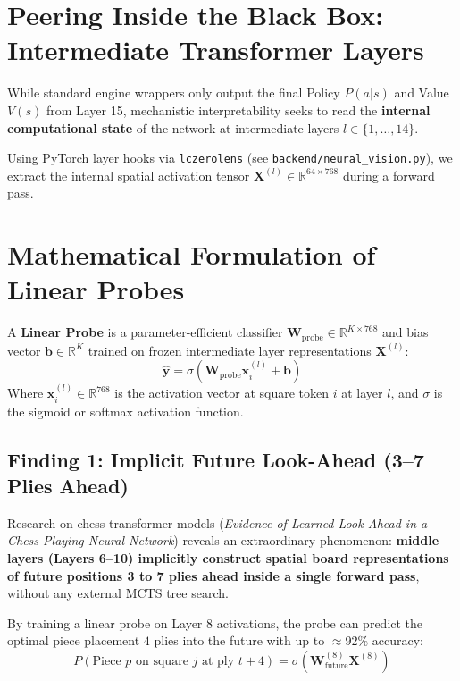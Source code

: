 \documentclass[11pt,a4paper]{report}
\begin{document}
\section{Peering Inside the Black Box: Intermediate Transformer Layers}
While standard engine wrappers only output the final Policy $P(a|s)$ and Value $V(s)$ from Layer 15, mechanistic interpretability seeks to read the \textbf{internal computational state} of the network at intermediate layers $l \in \{1, \dots, 14\}$.

Using PyTorch layer hooks via \texttt{lczerolens} (see \texttt{backend/neural\_vision.py}), we extract the internal spatial activation tensor $\mathbf{X}^{(l)} \in \mathbb{R}^{64 \times 768}$ during a forward pass.

\section{Mathematical Formulation of Linear Probes}
A \textbf{Linear Probe} is a parameter-efficient classifier $\mathbf{W}_{\text{probe}} \in \mathbb{R}^{K \times 768}$ and bias vector $\mathbf{b} \in \mathbb{R}^K$ trained on frozen intermediate layer representations $\mathbf{X}^{(l)}$:
\begin{equation}
\hat{\mathbf{y}} = \sigma \left( \mathbf{W}_{\text{probe}} \mathbf{x}_{i}^{(l)} + \mathbf{b} \right)
\end{equation}
Where $\mathbf{x}_{i}^{(l)} \in \mathbb{R}^{768}$ is the activation vector at square token $i$ at layer $l$, and $\sigma$ is the sigmoid or softmax activation function.

\subsection{Finding 1: Implicit Future Look-Ahead (3--7 Plies Ahead)}
Research on chess transformer models (\textit{Evidence of Learned Look-Ahead in a Chess-Playing Neural Network}) reveals an extraordinary phenomenon: \textbf{middle layers (Layers 6--10) implicitly construct spatial board representations of future positions 3 to 7 plies ahead inside a single forward pass}, without any external MCTS tree search.

By training a linear probe on Layer 8 activations, the probe can predict the optimal piece placement $4$ plies into the future with up to $\approx 92\%$ accuracy:
\begin{equation}
P(\text{Piece } p \text{ on square } j \text{ at ply } t+4) = \sigma \left( \mathbf{W}_{\text{future}}^{(8)} \mathbf{X}^{(8)} \right)
\end{equation}
\end{document}
